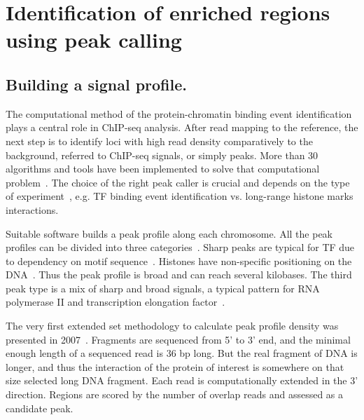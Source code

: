 \chapter{Identification of enriched regions using peak calling}

\section{Building a signal profile.}




The computational method of the protein-chromatin binding event identification plays a central role in ChIP-seq analysis. 
After read mapping to the reference, the next step is to identify loci with high read density comparatively to the background, referred to ChIP-seq signals, or simply peaks.
More than 30 algorithms and tools have been implemented to solve that computational problem~\cite{chen2012systematic}.
The choice of the right peak caller is crucial and depends on the type of experiment~\cite{nakato2017recent}, e.g. TF binding event identification vs. long-range histone marks interactions.



Suitable software builds a peak profile along each chromosome. 
All the peak profiles can be divided into three categories~\cite{park2009chip}. 
Sharp peaks are typical for TF due to dependency on motif sequence~\cite{landt2012chip}. 
Histones have non-specific positioning on the DNA~\cite{krig2007identification}. 
Thus the peak profile is broad and can reach several kilobases. 
The third peak type is a mix of sharp and broad signals, a typical pattern for RNA polymerase II and transcription elongation factor~\cite{squazzo2006suz12, lin2011dynamic}.



The very first extended set methodology to calculate peak profile density was presented in 2007~\cite{robertson2007genome}. 
Fragments are sequenced from 5' to 3' end, and the minimal enough length of a sequenced read is 36 bp long. 
But the real fragment of DNA is longer, and thus the interaction of the protein of interest is somewhere on that size selected long DNA fragment. 
Each read is computationally extended in the 3' direction. 
Regions are scored by the number of overlap reads and assessed as a candidate peak.



